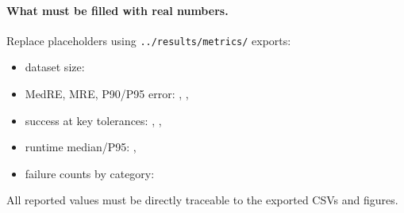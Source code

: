 \paragraph{What must be filled with real numbers.}
Replace placeholders using \texttt{../results/metrics/} exports:
\begin{itemize}
  \item dataset size: 
  \item MedRE, MRE, P90/P95 error: , , 
  \item success at key tolerances: , , 
  \item runtime median/P95: , 
  \item failure counts by category: 
\end{itemize}
All reported values must be directly traceable to the exported CSVs and figures.
